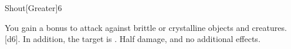 \begin{spellsection}{Shout}[Greater]{6}
    \begin{spellheader}
    \end{spellheader}
    \begin{spellcontent}
        \begin{spelltargetinginfo}
        \end{spelltargetinginfo}
        \begin{spelleffects}
            \spellspecial You gain a  bonus to attack against brittle or crystalline objects and creatures.
            \spellsuccess {}[d6]. In addition, the target is \deafened.
            \spellfailure Half damage, and no additional effects.
        \end{spelleffects}
    \end{spellcontent}
    \begin{spellfooter}
        \miscastexplode
    \end{spellfooter}
\end{spellsection}

